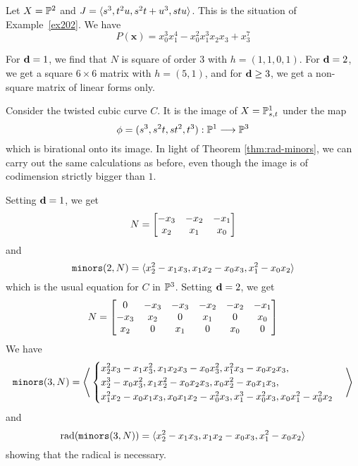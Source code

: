 \documentclass[fleqn,reqno]{amsart}
\begin{document}
\begin{example}[$\mt{ex306}$]
\label{ex306}
Let $X=\mathbb{P}^2$ and $J=\langle s^{3},t^{2} u,s^{2} t+u^{3},s t u\rangle$.
This is the situation of Example~\ref{ex202}.
We have 
\[
	P(\mathbf x)={x}_{0}^{3} {x}_{1}^{4}-{x}_{0}^{2} {x}_{1}^{3} {x}_{2} {x}_{3}+{x}_{3}^{7}
\]

For $\mathbf d=1$, we find that $N$ is square of order $3$ with $h=(1,1,0,1)$.
For $\mathbf d=2$, we get a square $6\times6$ matrix with $h=(5,1)$,
and for $\mathbf d\geq3$, we get a non-square matrix of linear forms only.
\end{example}

\begin{example}[$\mt{ex307}$]
\label{ex307}
Consider the twisted cubic curve $C$.
It is the image of $X=\mathbb{P}^1_{s,t}$ under the map
\[
	\phi=(s^3,s^2t,st^2,t^3):\mathbb{P}^1\longrightarrow\mathbb{P}^3
\]
which is birational onto its image.
In light of Theorem \ref{thm:rad-minors}, we can carry out the same calculations
as before, even though the image is of codimension strictly bigger than $1$.

Setting $\mathbf d=1$, we get
\[
	N=
	\bgroup\begin{bmatrix}{-{x}_{3}}&
      {-{x}_{2}}&
      {-{x}_{1}}\\
      {x}_{2}&
      {x}_{1}&
      {x}_{0}\\
      \end{bmatrix}\egroup
\]
and
\[
	\mathop{\tt minors}(2,N)=\langle {x}_{2}^{2}-{x}_{1} {x}_{3},{x}_{1} {x}_{2}-{x}_{0}
      {x}_{3},{x}_{1}^{2}-{x}_{0} {x}_{2}\rangle
\]
which is the usual equation for $C$ in $\mathbb{P}^3$. Setting $\mathbf d=2$, we get
\[
	N=
	\bgroup\begin{bmatrix}0&
      {-{x}_{3}}&
      {-{x}_{3}}&
      {-{x}_{2}}&
      {-{x}_{2}}&
      {-{x}_{1}}\\
      {-{x}_{3}}&
      {x}_{2}&
      0&
      {x}_{1}&
      0&
      {x}_{0}\\
      {x}_{2}&
      0&
      {x}_{1}&
      0&
      {x}_{0}&
      0\\
      \end{bmatrix}\egroup
\]
We have
\[
	\mathop{\tt minors}(3,N)=\Bigg\langle
	\begin{cases}
	{x}_{2}^{2} {x}_{3}-{x}_{1} {x}_{3}^{2},
	{x}_{1} {x}_{2} {x}_{3}-{x}_{0}{x}_{3}^{2},
	{x}_{1}^{2} {x}_{3}-{x}_{0} {x}_{2} {x}_{3},\\
	{x}_{2}^{3}-{x}_{0}{x}_{3}^{2},
	{x}_{1} {x}_{2}^{2}-{x}_{0} {x}_{2} {x}_{3},
	{x}_{0}{x}_{2}^{2}-{x}_{0} {x}_{1} {x}_{3},\\
	{x}_{1}^{2} {x}_{2}-{x}_{0} {x}_{1}{x}_{3},
	{x}_{0} {x}_{1} {x}_{2}-{x}_{0}^{2} {x}_{3},
	{x}_{1}^{3}-{x}_{0}^{2}{x}_{3},{x}_{0} {x}_{1}^{2}-{x}_{0}^{2} {x}_{2}
	\end{cases}
	\Bigg\rangle
\]
and
\[
	\operatorname{rad}(\mathop{\tt minors}(3,N))=
	\langle {x}_{2}^{2}-{x}_{1} {x}_{3},{x}_{1} {x}_{2}-{x}_{0}
	      {x}_{3},{x}_{1}^{2}-{x}_{0} {x}_{2}\rangle
\]
showing that the radical is necessary.
\end{example}
\end{document}

